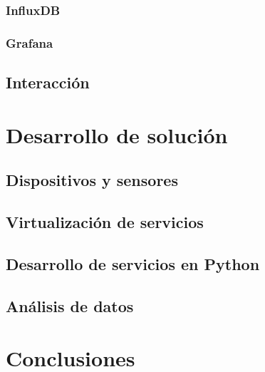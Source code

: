 \documentclass[12pt, a4paper]{article}
\begin{document}
        \subsubsection{InfluxDB}
        \subsubsection{Grafana}

        \subsection{Interacción}
        


        \section{Desarrollo de solución}

        \subsection{Dispositivos y sensores}

        \subsection{Virtualización de servicios}
        
        \subsection{Desarrollo de servicios en Python}
        
        \subsection{Análisis de datos}
        
        \section{Conclusiones}

\end{document}
